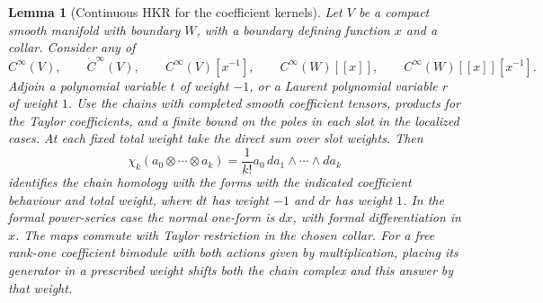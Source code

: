 \documentclass[11pt,oneside,reqno]{article}
\theoremstyle{plain}
\newtheorem{lemma}[theorem]{Lemma}
\theoremstyle{definition}
\theoremstyle{remark}
\begin{document}
\begin{lemma}[Continuous HKR for the coefficient kernels]\label{lem:smooth-HKR}
Let \(V\) be a compact smooth manifold with boundary \(W\), with a
boundary defining function \(x\) and a collar. Consider any of
\[
 C^\infty(V),\qquad
 \dot C^\infty(V),\qquad
 C^\infty(V)[x^{-1}],\qquad
 C^\infty(W)[[x]],\qquad
 C^\infty(W)[[x]][x^{-1}].
\]
Adjoin a polynomial variable \(t\) of weight \(-1\), or a Laurent
polynomial variable \(r\) of weight \(1\). Use the chains with completed
smooth coefficient tensors, products for the Taylor coefficients, and a
finite bound on the poles in each slot in the localized cases. At each
fixed total weight take the direct sum over slot weights. Then
\[
 \chi_k(a_0\otimes\cdots\otimes a_k)
    =\frac{1}{k!}a_0\,da_1\wedge\cdots\wedge da_k
\]
identifies the chain homology with the forms with the indicated
coefficient behaviour and total weight, where \(dt\) has weight \(-1\)
and \(dr\) has weight \(1\). In the formal power-series case the normal
one-form is \(dx\), with formal differentiation in \(x\). The maps
commute with Taylor restriction in the chosen collar. For a free
rank-one coefficient bimodule with both actions given by
multiplication, placing its generator in a prescribed weight shifts
both the chain complex and this answer by that weight.
\end{lemma}
\end{document}

